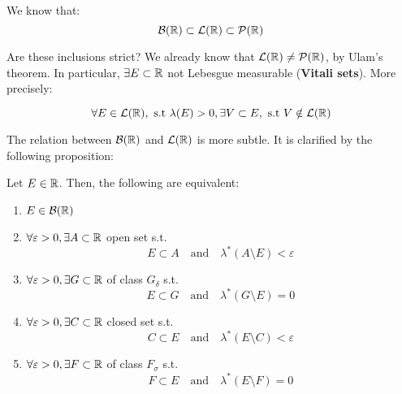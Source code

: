 \vspace{1em}

We know that:
$$\mathcal{B}(\mathbb{R}) \subset \mathcal{L}(\mathbb{R}) \subset \mathcal{P}(\mathbb{R})$$

Are these inclusions strict? We already know that $\mathcal{L}(\mathbb{R}) \neq \mathcal{P}(\mathbb{R})$, by 
Ulam's theorem. In particular, $\exists E \subset \mathbb{R}$ not Lebesgue measurable 
(\textbf{Vitali sets}). More precisely: 

$$\forall E \in \mathcal{L}(\mathbb{R}), \text{ s.t } \lambda(E) > 0, \exists V \subset E, \text{ s.t } V \notin \mathcal{L}(\mathbb{R})$$

The relation between $\mathcal{B}(\mathbb{R})$ and $\mathcal{L}(\mathbb{R})$ is more subtle. It is clarified by the following
proposition:

\begin{fproposition}
    Let $E \in \mathbb{R}$. Then, the following are equivalent:
    \vspace{1em}
    \begin{enumerate}[label=(\roman*)]
        \item $E \in \mathcal{B}(\mathbb{R})$
        \vspace{1em}
        \item $\forall \varepsilon > 0, \exists A \subset \mathbb{R}$ open set s.t.
        $$E \subset A \quad \text{and} \quad \lambda^{*}(A \setminus E) < \varepsilon$$

        \vspace{1em}    
    
        \item $\forall \varepsilon > 0, \exists G \subset \mathbb{R}$ of class $G_{\delta}$ s.t.
        $$E \subset G \quad \text{and} \quad \lambda^{*}(G \setminus E) = 0$$

        \vspace{1em}

        \item $\forall \varepsilon > 0, \exists C \subset \mathbb{R}$ closed set s.t.
        $$C \subset E \quad \text{and} \quad \lambda^{*}(E \setminus C) < \varepsilon$$

        \vspace{1em}

        \item $\forall \varepsilon > 0, \exists F \subset \mathbb{R}$ of class $F_{\sigma}$ s.t.
        $$F \subset E \quad \text{and} \quad \lambda^{*}(E \setminus F) = 0$$
    
    \end{enumerate}
\end{fproposition}

